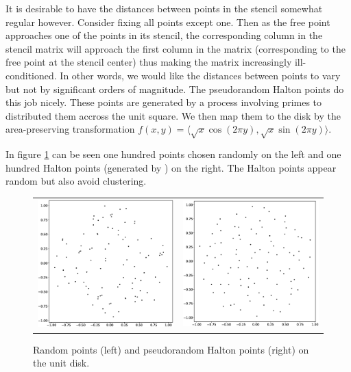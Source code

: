 \documentclass[12pt]{article}
\begin{document}
It is desirable to have the distances between points in the stencil somewhat regular however. Consider fixing all points except one. Then as the free point approaches one of the points in its stencil, the corresponding column in the stencil matrix will approach the first column in the matrix (corresponding to the free point at the stencil center) thus making the matrix increasingly ill-conditioned. In other words, we would like the distances between points to vary but not by significant orders of magnitude. The pseudorandom Halton \cite{Halton1960} points do this job nicely. These points are generated by a process involving primes to distributed them accross the unit square. We then map them to the disk by the area-preserving transformation $f(x, y) = \langle \sqrt{x}\cos(2\pi y), \sqrt{x}\sin(2 \pi y) \rangle$.


In figure \ref{randomhalton} can be seen one hundred points chosen randomly on the left and one hundred Halton points (generated by \cite{Burkardt2016}) on the right. The Halton points appear random but also avoid clustering.

\begin{figure}[ht]
	\centering
	\begin{tabular}{cc}
		\includegraphics[width=.5\textwidth]{random_100_disk.eps} & \includegraphics[width=.5\textwidth]{halton_100_disk.eps} \\
	\end{tabular}
	\caption{Random points (left) and pseudorandom Halton points (right) on the unit disk.}
	\label{randomhalton}
\end{figure}
\end{document}
